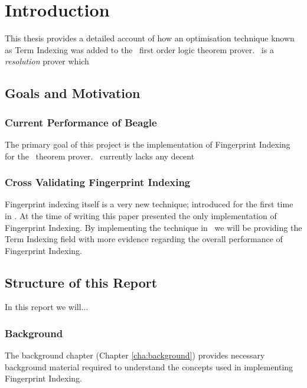 
\chapter{Introduction}
\label{cha:intro}

This thesis provides a detailed account of how an optimisation technique known
as Term Indexing was added to the \beagle\ first order logic theorem prover. \Beagle\ 
is a \emph{resolution} prover which 

\section{Goals and Motivation}
\label{sec:mot}

\subsection{Current Performance of Beagle}

The primary goal of this project is the implementation of Fingerprint Indexing
for the \beagle\ theorem prover.
\Beagle\ currently lacks any decent 

\subsection{Cross Validating Fingerprint Indexing}

Fingerprint indexing itself is a very new technique; introduced for the first
time in \cite{shulz12}. At the time of writing this paper presented the only
implementation of Fingerprint Indexing. By implementing the technique in \beagle\ 
we will be providing the Term Indexing field with more evidence regarding the
overall performance of Fingerprint Indexing. 

\section{Structure of this Report}
\label{sec:framework}

In this report we will...

\subsection{Background}

The background chapter (Chapter \ref{cha:background}) provides necessary background material required to understand
the concepts used in implementing Fingerprint Indexing.

